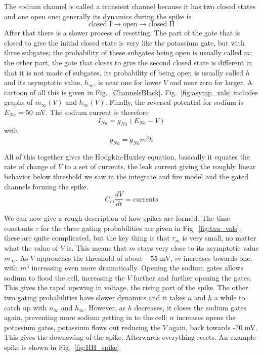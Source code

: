 \documentclass{article}
\begin{document}
The sodium channel is called a transient channel because it has two
closed states and one open one; generally its dynamics during the
spike is
\begin{equation}
\mbox{closed I}\rightarrow \mbox{open}\rightarrow\mbox{closed II}
\end{equation}
After that there is a slower process of resetting. The part of the
gate that is closed to give the initial closed state is very like the
potassium gate, but with three subgates; the probability of these
subgates being open is usually called $m$; the other part, the gate
that closes to give the second closed state is different in that it is
not made of subgates, its probability of being open is usually called
$h$ and its asymptotic value, $h_\infty$, is near one for lower $V$
and near zero for larger. A cartoon of all this is given in Fig.~\ref{ChannelsBlack}. Fig.~\ref{fig:asymp_vals} includes graphs of $m_\infty(V)$
and $h_\infty(V)$. Finally, the reversal potential for sodium is
$E_{Na}=50$ mV. The sodium current is therefore
\begin{equation}
I_{Na}=g_{Na}(E_{Na}-V)
\end{equation}
with
\begin{equation}
g_{Na}=\bar{g}_{Na}m^3h
\end{equation}


All of this together gives the Hodgkin-Huxley equation, basically it
equates the rate of change of $V$ to a set of currents, the leak
current giving the roughly linear behavior below threshold we saw in
the integrate and fire model and the gated channels forming the
spike.
\begin{equation}
C_m\frac{dV}{dt}=\mbox{currents}
\end{equation}

We can now give a rough description of how spikes are formed. The time
constants $\tau$ for the three gating probabilities are given in
Fig.~\ref{fig:tau_vals}, these are quite complicated, but the key
thing is that $\tau_m$ is very small, no matter what the value of $V$
is. This means that $m$ stays very close to its asymptotic value
$m_\infty$. As $V$ approaches the threshold of about $-55$ mV, $m$
increases towards one, with $m^3$ increasing even more
dramatically. Opening the sodium gates allows sodium to flood the
cell, increasing the $V$ further and further opening the gates. This
gives the rapid upswing in voltage, the rising part of the spike. The
other two gating probabilities have slower dynamics and it takes $n$
and $h$ a while to catch up with $n_\infty$ and $h_\infty$. However,
as $h$ decreases, it closes the sodium gates again, preventing more
sodium getting in to the cell; $n$ increases opens the potassium
gates, potassium flows out reducing the $V$ again, back towards -70
mV. This gives the downswing of the spike. Afterwards everything
resets. An example spike is shown in Fig.~\ref{fig:HH_spike}.
\end{document}
